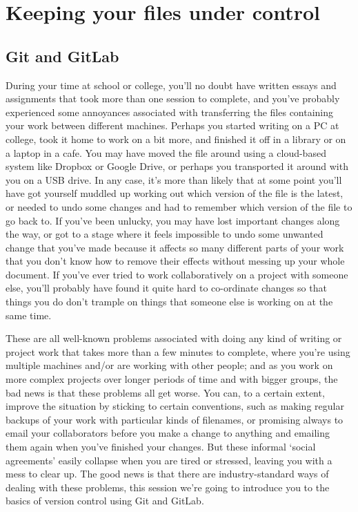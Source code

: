 \chapter[Version Control]{Keeping your files under control}
\minitoc
{}

\section{Git and GitLab}

During your time at school or college, you'll no doubt have written essays and assignments that took more than one session to complete, and you've probably experienced some annoyances associated with transferring the files containing your work between different machines. Perhaps you started writing on a PC at college, took it home to work on a bit more, and finished it off in a library or on a laptop in a cafe. You may have moved the file around using a cloud-based system like Dropbox or Google Drive, or perhaps you transported it around with you on a USB drive. In any case, it's more than likely that at some point you'll have got yourself muddled up working out which version of the file is the latest, or needed to undo some changes and had to remember which version of the file to go back to. If you've been unlucky, you may have lost important changes along the way, or got to a stage where it feels impossible to undo some unwanted change that you've made because it affects so many different parts of your work that you don't know how to remove their effects without messing up your whole document. If you've ever tried to work collaboratively on a project with someone else, you'll probably have found it quite hard to co-ordinate changes so that things you do don't trample on things that someone else is working on at the same time. 

These are all well-known problems associated with doing any kind of writing or project work that takes more than a few minutes to complete, where you're using multiple machines and/or are working with other people; and as you work on more complex projects over longer periods of time and with bigger groups, the bad news is that these problems all get worse. You can, to a certain extent, improve the situation by sticking to certain conventions, such as making regular backups of your work with particular kinds of filenames, or promising always to email your collaborators before you make a change to anything and emailing them again when you've finished your changes. But these informal `social agreements' easily collapse when you are tired or stressed, leaving you with a mess to clear up. The good news is that there are industry-standard ways of dealing with these problems, this session we're going to introduce you to the basics of version control using Git and GitLab. 

